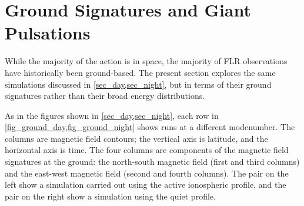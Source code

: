 





\section{Ground Signatures and Giant Pulsations}
  \label{sec_ground}

While the majority of the action is in space, the majority of FLR observations have historically been ground-based. The present section explores the same simulations discussed in \cref{sec_day,sec_night}, but in terms of their ground signatures rather than their broad energy distributions. 

As in the figures shown in \cref{sec_day,sec_night}, each row in \cref{fig_ground_day,fig_ground_night} shows runs at a different modenumber. The columns are magnetic field contours; the vertical axis is latitude, and the horizontal axis is time. The four columns are components of the magnetic field signatures at the ground:  the north-south magnetic field (first and third columns) and the east-west magnetic field (second and fourth columns). The pair on the left show a simulation carried out using the active ionospheric profile, and the pair on the right show a simulation using the quiet profile. 


